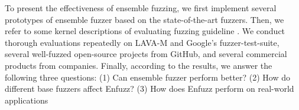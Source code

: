 To present the effectiveness of ensemble fuzzing, we first implement several prototypes of ensemble fuzzer based on the state-of-the-art fuzzers. Then, we refer to some kernel descriptions of evaluating fuzzing guideline \cite{klees2018evaluating}. We conduct thorough evaluations repeatedly   on LAVA-M and Google's fuzzer-test-suite, several well-fuzzed open-source projects from GitHub, and several commercial products from companies. Finally, according to the results, we answer the following three questions:
(1) Can ensemble fuzzer perform better?
(2) How do different base fuzzers affect Enfuzz?
(3) How does Enfuzz perform on real-world applications




	 
